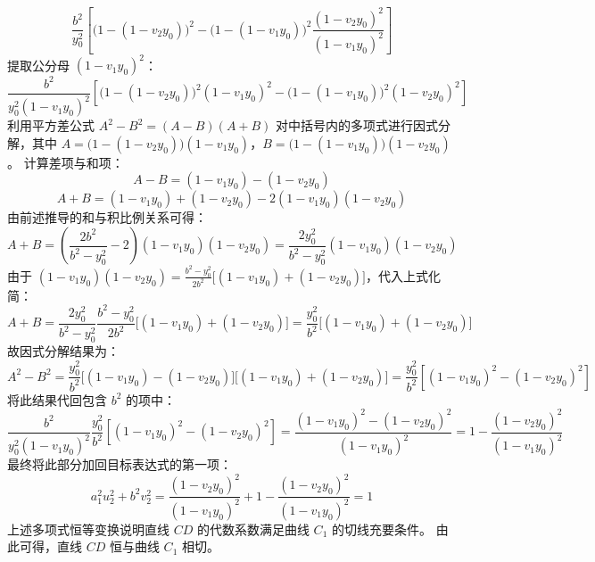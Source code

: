 \begin{solution}
$$ \frac{b^2}{y_0^2} \left[ \big(1 - (1 - v_2 y_0)\big)^2 - \big(1 - (1 - v_1 y_0)\big)^2 \frac{(1 - v_2 y_0)^2}{(1 - v_1 y_0)^2} \right] $$
提取公分母 $(1 - v_1 y_0)^2$：
$$ \frac{b^2}{y_0^2 (1 - v_1 y_0)^2} \left[ \big(1 - (1 - v_2 y_0)\big)^2 (1 - v_1 y_0)^2 - \big(1 - (1 - v_1 y_0)\big)^2 (1 - v_2 y_0)^2 \right] $$
利用平方差公式 $A^2 - B^2 = (A - B)(A + B)$ 对中括号内的多项式进行因式分解，其中 $A = \big(1 - (1 - v_2 y_0)\big)(1 - v_1 y_0)$，$B = \big(1 - (1 - v_1 y_0)\big)(1 - v_2 y_0)$。
计算差项与和项：
$$ A - B = (1 - v_1 y_0) - (1 - v_2 y_0) $$
$$ A + B = (1 - v_1 y_0) + (1 - v_2 y_0) - 2(1 - v_1 y_0)(1 - v_2 y_0) $$
由前述推导的和与积比例关系可得：
$$ A + B = \left( \frac{2 b^2}{b^2 - y_0^2} - 2 \right) (1 - v_1 y_0)(1 - v_2 y_0) = \frac{2 y_0^2}{b^2 - y_0^2} (1 - v_1 y_0)(1 - v_2 y_0) $$
由于 $(1 - v_1 y_0)(1 - v_2 y_0) = \frac{b^2 - y_0^2}{2 b^2} \big[ (1 - v_1 y_0) + (1 - v_2 y_0) \big]$，代入上式化简：
$$ A + B = \frac{2 y_0^2}{b^2 - y_0^2} \frac{b^2 - y_0^2}{2 b^2} \big[ (1 - v_1 y_0) + (1 - v_2 y_0) \big] = \frac{y_0^2}{b^2} \big[ (1 - v_1 y_0) + (1 - v_2 y_0) \big] $$
故因式分解结果为：
$$ A^2 - B^2 = \frac{y_0^2}{b^2} \big[ (1 - v_1 y_0) - (1 - v_2 y_0) \big] \big[ (1 - v_1 y_0) + (1 - v_2 y_0) \big] = \frac{y_0^2}{b^2} \left[ (1 - v_1 y_0)^2 - (1 - v_2 y_0)^2 \right] $$
将此结果代回包含 $b^2$ 的项中：
$$ \frac{b^2}{y_0^2 (1 - v_1 y_0)^2} \frac{y_0^2}{b^2} \left[ (1 - v_1 y_0)^2 - (1 - v_2 y_0)^2 \right] = \frac{(1 - v_1 y_0)^2 - (1 - v_2 y_0)^2}{(1 - v_1 y_0)^2} = 1 - \frac{(1 - v_2 y_0)^2}{(1 - v_1 y_0)^2} $$
最终将此部分加回目标表达式的第一项：
$$ a_1^2 u_2^2 + b^2 v_2^2 = \frac{(1 - v_2 y_0)^2}{(1 - v_1 y_0)^2} + 1 - \frac{(1 - v_2 y_0)^2}{(1 - v_1 y_0)^2} = 1 $$
上述多项式恒等变换说明直线 $CD$ 的代数系数满足曲线 $C_1$ 的切线充要条件。
由此可得，直线 $CD$ 恒与曲线 $C_1$ 相切。

\end{solution}

